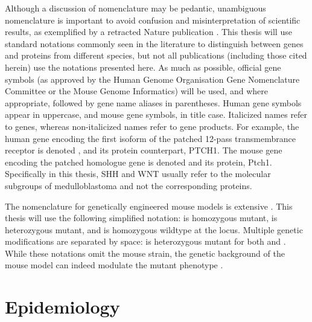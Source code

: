 Although a discussion of nomenclature may be pedantic, unambiguous nomenclature is important to avoid confusion and misinterpretation of scientific results, as exemplified by a retracted Nature publication . This thesis will use standard notations commonly seen in the literature to distinguish between genes and proteins from different species, but not all publications (including those cited herein) use the notations presented here. As much as possible, official gene symbols (as approved by the Human Genome Organisation Gene Nomenclature Committee or the Mouse Genome Informatics) will be used, and where appropriate, followed by gene name aliases in parentheses. Human gene symbols appear in uppercase, and mouse gene symbols, in title case. Italicized names refer to genes, whereas non-italicized names refer to gene products. For example, the human gene encoding the first isoform of the patched 12-pass transmembrance receptor is denoted , and its protein counterpart, PTCH1. The mouse gene encoding the patched homologue gene is denoted  and its protein, Ptch1. Specifically in this thesis, SHH and WNT usually refer to the molecular subgroups of medulloblastoma and not the corresponding proteins.

The nomenclature for genetically engineered mouse models is extensive . This thesis will use the following simplified notation: \high{-/-} is homozygous mutant, \high{-/+} is heterozygous mutant, and \high{+/+} is homozygous wildtype at the  locus. Multiple genetic modifications are separated by space: \high{+/-} \high{+/-} is heterozygous mutant for both  and . While these notations omit the mouse strain, the genetic background of the mouse model can indeed modulate the mutant phenotype .


\section{Epidemiology}

